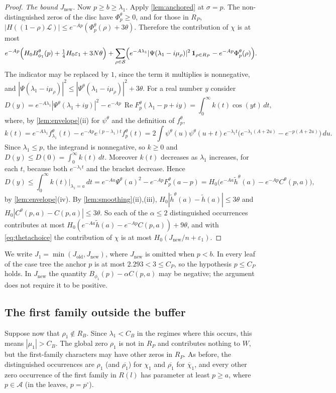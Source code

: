 \documentclass[11pt]{amsart}
\numberwithin{equation}{section}
\theoremstyle{plain}
\theoremstyle{definition}
\theoremstyle{remark}
\newcommand{\LL}{\mathcal{L}}
\renewcommand{\Re}{\operatorname{Re}}
\newcommand{\cS}{\mathcal{S}}
\newcommand{\eps}{\varepsilon}
\newcommand{\1}{\mathbf{1}}
\newcommand{\bchi}{\overline{\chi}}
\begin{document}
\begin{proof}
\emph{The bound $J_{\mathrm{new}}$.} Now $p\ge b\ge\lambda_1$. Apply \cref{lem:anchored} at
$\sigma=p$. The non-distinguished zeros of the disc have $\Phi^\theta_p\ge0$, and for those in $R_P$,
$|H((1-\rho)\LL)|\le e^{-Ap}(\Phi^\theta_p(\rho)+3\theta)$. Therefore the contribution of $\chi$ is at
most
\[
  e^{-Ap}\Bigl(H_0B^\theta_{\phi_1}(p)+\tfrac14H_0\eps_1+3N\theta\Bigr)
  +\sum_{\rho\in\cS}\Bigl(e^{-A\lambda_1}|\Psi(\lambda_1-i\mu_\rho)|^2\,\1_{\rho\in R_P}-e^{-Ap}\Phi^\theta_p(\rho)\Bigr).
\]
The indicator may be replaced by $1$, since the term it multiplies is nonnegative, and
$|\Psi(\lambda_1-i\mu_\rho)|^2\le|\Psi^\theta(\lambda_1-i\mu_\rho)|^2+3\theta$. For a real number $y$ consider
\[
  D(y)=e^{-A\lambda_1}|\Psi^\theta(\lambda_1+iy)|^2-e^{-Ap}\,\Re F^\theta_p(\lambda_1-p+iy)
  =\int_0^\infty k(t)\cos(yt)\,dt,
\]
where, by \cref{lem:envelope}(ii) for $\psi^\theta$ and the definition of $f^\theta_p$,
\[
  k(t)=e^{-A\lambda_1}f^\theta_{\lambda_1}(t)-e^{-Ap}e^{(p-\lambda_1)t}f^\theta_p(t)
  =2\int\psi^\theta(u)\psi^\theta(u+t)e^{-\lambda_1t}\bigl(e^{-\lambda_1(A+2u)}-e^{-p(A+2u)}\bigr)\,du .
\]
Since $\lambda_1\le p$, the integrand is nonnegative, so $k\ge0$ and $D(y)\le D(0)=\int_0^\infty
k(t)\,dt$. Moreover $k(t)$ decreases as $\lambda_1$ increases, for each $t$, because both
$e^{-\lambda_1t}$ and the bracket decrease. Hence
\[
  D(y)\le\int_0^\infty k(t)\big|_{\lambda_1=a}\,dt=e^{-Aa}\Psi^\theta(a)^2-e^{-Ap}F^\theta_p(a-p)
  =H_0\bigl(e^{-Aa}\tilde h^\theta(a)-e^{-Ap}C^\theta(p,a)\bigr),
\]
by \cref{lem:envelope}(iv). By \cref{lem:smoothing}(ii),(iii), $H_0|\tilde h^\theta(a)-\tilde h(a)|\le3\theta$ and
$H_0|C^\theta(p,a)-C(p,a)|\le3\theta$. So each of the $\alpha\le2$ distinguished occurrences contributes at
most $H_0(e^{-Aa}\tilde h(a)-e^{-Ap}C(p,a))+9\theta$, and with \eqref{eq:thetachoice} the contribution of $\chi$ is
at most $H_0(J_{\mathrm{new}}/n+\eps_1)$.
\end{proof}

We write $J_1=\min(J_{\mathrm{old}},J_{\mathrm{new}})$, where $J_{\mathrm{new}}$ is omitted when
$p<b$. In every leaf of the case tree the anchor $p$ is at most $2.293<3\le C_P$, so the hypothesis
$p\le C_P$ holds. In $J_{\mathrm{new}}$ the quantity $B_{\phi_1}(p)-\alpha C(p,a)$ may be negative; the
argument does not require it to be positive.

\subsection{The first family outside the buffer}\label{subsec:firstoutside}
Suppose now that $\rho_1\notin R_B$. Since $\lambda_1<C_B$ in the regimes where this occurs,
this means $|\mu_1|>C_B$. The global zero $\rho_1$ is not in $R_P$ and contributes nothing to $W$,
but the first-family characters may have other zeros in $R_P$. As before, the distinguished
occurrences are $\rho_1$ (and $\overline{\rho_1}$) for $\chi_1$ and $\overline{\rho_1}$ for $\bchi_1$, and
every other zero occurrence of the first family in $R(l)$ has parameter at least $p\ge a$, where $p\in\mathcal A$
(in the leaves, $p=p^\circ$).
\end{document}
